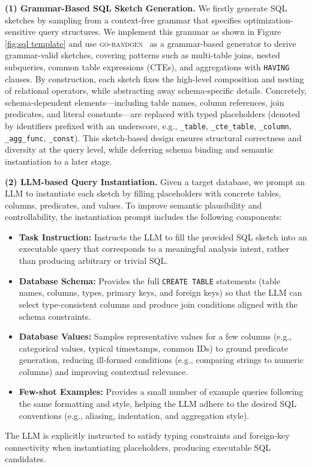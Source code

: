 \textbf{(1) Grammar-Based SQL Sketch Generation.}
We firstly generate SQL sketches by sampling from a context-free grammar that specifies optimization-sensitive query structures.
We implement this grammar as shown in Figure \ref{fig:sql template} and use \textsc{go-randgen}~\cite{go-randgen} as a grammar-based generator to derive grammar-valid sketches, covering patterns such as multi-table joins, nested subqueries, common table expressions (CTEs), and aggregations with \texttt{HAVING} clauses.
By construction, each sketch fixes the high-level composition and nesting of relational operators, while abstracting away schema-specific details.
Concretely, schema-dependent elements—including table names, column references, join predicates, and literal constants—are replaced with typed placeholders (denoted by identifiers prefixed with an underscore, e.g., \texttt{\_table}, \texttt{\_cte\_table}, \texttt{\_column}, \texttt{\_agg\_func}, \texttt{\_const}).
This sketch-based design ensures structural correctness and diversity at the query level, while deferring schema binding and semantic instantiation to a later stage.

\textbf{(2) LLM-based Query Instantiation.}
Given a target database, we prompt an LLM to instantiate each sketch by filling placeholders with concrete tables, columns, predicates, and values.
To improve semantic plausibility and controllability, the instantiation prompt includes the following components:
\begin{itemize}[leftmargin=10pt]
	\item \textbf{Task Instruction:} Instructs the LLM to fill the provided SQL sketch into an executable query that corresponds to a meaningful analysis intent, rather than producing arbitrary or trivial SQL.
	\item \textbf{Database Schema:} Provides the full \texttt{CREATE TABLE} statements (table names, columns, types, primary keys, and foreign keys) so that the LLM can select type-consistent columns and produce join conditions aligned with the schema constraints.
	\item \textbf{Database Values:} Samples representative values for a few columns (e.g., categorical values, typical timestamps, common IDs) to ground predicate generation, reducing ill-formed conditions (e.g., comparing strings to numeric columns) and improving contextual relevance.
	\item \textbf{Few-shot Examples:} Provides a small number of example queries following the same formatting and style, helping the LLM adhere to the desired SQL conventions (e.g., aliasing, indentation, and aggregation style).
\end{itemize}
The LLM is explicitly instructed to satisfy typing constraints and foreign-key connectivity when instantiating placeholders, producing executable SQL candidates.

